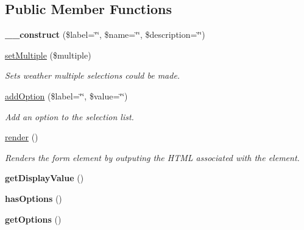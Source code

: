 \subsection*{Public Member Functions}
\begin{DoxyCompactItemize}
\item 
\hypertarget{class_selection_list_adf257c6af41f0e166719c322812c0681}{
{\bfseries \_\-\_\-construct} (\$label=\char`\"{}\char`\"{}, \$name=\char`\"{}\char`\"{}, \$description=\char`\"{}\char`\"{})}
\label{class_selection_list_adf257c6af41f0e166719c322812c0681}

\item 
\hypertarget{class_selection_list_a416dc88e62e3364faa349e677ebf1e7a}{
\hyperlink{class_selection_list_a416dc88e62e3364faa349e677ebf1e7a}{setMultiple} (\$multiple)}
\label{class_selection_list_a416dc88e62e3364faa349e677ebf1e7a}

\begin{DoxyCompactList}\small\item\em Sets weather multiple selections could be made. \item\end{DoxyCompactList}\item 
\hyperlink{class_selection_list_af99bb78778a2aadfc216057a9144c0e5}{addOption} (\$label=\char`\"{}\char`\"{}, \$value=\char`\"{}\char`\"{})
\begin{DoxyCompactList}\small\item\em Add an option to the selection list. \item\end{DoxyCompactList}\item 
\hyperlink{class_selection_list_a81f51cae34c1a60535f02d3167add7ae}{render} ()
\begin{DoxyCompactList}\small\item\em Renders the form element by outputing the HTML associated with the element. \item\end{DoxyCompactList}\item 
\hypertarget{class_selection_list_a669a18a3829813a2baccbac0e21d6a33}{
{\bfseries getDisplayValue} ()}
\label{class_selection_list_a669a18a3829813a2baccbac0e21d6a33}

\item 
\hypertarget{class_selection_list_aa041e1d6a17b2713ebd402d361d28645}{
{\bfseries hasOptions} ()}
\label{class_selection_list_aa041e1d6a17b2713ebd402d361d28645}

\item 
\hypertarget{class_selection_list_a69c779a5bc9fdfa9b9cb157d0c3d9f4a}{
{\bfseries getOptions} ()}
\label{class_selection_list_a69c779a5bc9fdfa9b9cb157d0c3d9f4a}

\end{DoxyCompactItemize}
